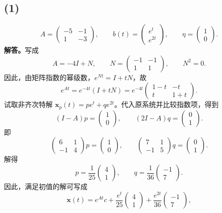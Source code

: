 \documentclass[11pt,a4paper]{ctexart}
\newcommand{\xx}{\boldsymbol{x}}
\begin{document}
\subsection*{(1)}
\[
A=\begin{pmatrix}-5&-1\\1&-3\end{pmatrix},\qquad
b(t)=\begin{pmatrix}e^t\\e^{2t}\end{pmatrix},\qquad
\eta=\begin{pmatrix}1\\0\end{pmatrix}.
\]
\textbf{解答。}写成
\[
A=-4I+N,\qquad N=\begin{pmatrix}-1&-1\\1&1\end{pmatrix},\qquad N^2=0.
\]
因此，由矩阵指数的幂级数，$e^{Nt}=I+tN$，故
\[
e^{At}=e^{-4t}(I+tN)
=e^{-4t}\begin{pmatrix}1-t&-t\\t&1+t\end{pmatrix}.
\]
试取非齐次特解 $\xx_p(t)=pe^t+qe^{2t}$。代入原系统并比较指数项，得到
\[
(I-A)p=\begin{pmatrix}1\\0\end{pmatrix},\qquad
(2I-A)q=\begin{pmatrix}0\\1\end{pmatrix}.
\]
即
\[
\begin{pmatrix}6&1\\-1&4\end{pmatrix}p=\begin{pmatrix}1\\0\end{pmatrix},\qquad
\begin{pmatrix}7&1\\-1&5\end{pmatrix}q=\begin{pmatrix}0\\1\end{pmatrix}.
\]
解得
\[
p=\frac1{25}\begin{pmatrix}4\\1\end{pmatrix},\qquad
q=\frac1{36}\begin{pmatrix}-1\\7\end{pmatrix}.
\]
因此，满足初值的解可写成
\[
\xx(t)=e^{At}c+\frac{e^t}{25}\begin{pmatrix}4\\1\end{pmatrix}
+\frac{e^{2t}}{36}\begin{pmatrix}-1\\7\end{pmatrix},
\]
\end{document}
